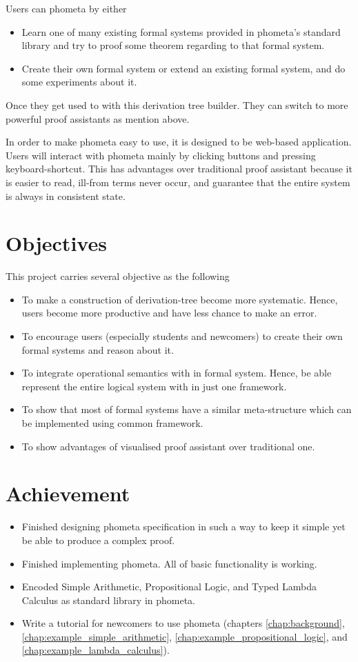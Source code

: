 \documentclass[master.tex]{subfiles}
\begin{document}
\newpage

Users can phometa by either
\begin{itemize}
\item Learn one of many existing formal systems provided in phometa's standard
  library and try to proof some theorem regarding to that formal system.
\item Create their own formal system or extend an existing formal system, and do
  some experiments about it.
\end{itemize}
Once they get used to with this derivation tree builder. They can switch to more
powerful proof assistants as mention above.

In order to make phometa easy to use, it is designed to be web-based
application. Users will interact with phometa mainly by clicking buttons and
pressing keyboard-shortcut. This has advantages over traditional proof assistant
because it is easier to read, ill-from terms never occur, and guarantee that the
entire system is always in consistent state.

\section{Objectives}
This project carries several objective as the following
\begin{itemize}
  \item To make a construction of derivation-tree become more systematic. Hence, users become more productive and have less chance to make an error.
  \item To encourage users (especially students and newcomers) to create their own formal systems and reason about it.
  \item To integrate operational semantics with in formal system. Hence, be able represent the entire logical system with in just one framework.
  \item To show that most of formal systems have a similar meta-structure which can be implemented using common framework.
  \item To show advantages of visualised proof assistant over traditional one.
\end{itemize}

\section{Achievement}
\begin{itemize}
\item Finished designing phometa specification in such a way to keep it simple yet be able
  to produce a complex proof.
\item Finished implementing phometa. All of basic functionality is working.
\item Encoded Simple Arithmetic, Propositional Logic, and Typed Lambda Calculus
  as standard library in phometa.
\item Write a tutorial for newcomers to use phometa (chapters
  \ref{chap:background}, \ref{chap:example_simple_arithmetic},
  \ref{chap:example_propositional_logic}, and
  \ref{chap:example_lambda_calculus}).
\end{itemize}
\end{document}
